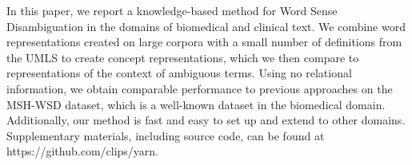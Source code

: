 In this paper, we report a knowledge-based method for Word Sense Disambiguation in the domains of biomedical and clinical text. We combine word representations created on large corpora with a small number of definitions from the UMLS to create concept representations, which we then compare to representations of the context of ambiguous terms. Using no relational information, we obtain comparable performance to previous approaches on the MSH-WSD dataset, which is a well-known dataset in the biomedical domain. Additionally, our method is fast and easy to set up and extend to other domains. Supplementary materials, including source code, can be found at https://github.com/clips/yarn.
